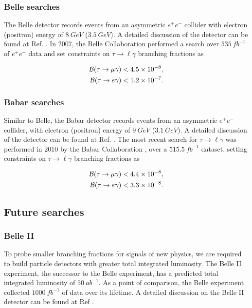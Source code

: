 \documentclass[12pt,a4paper]{article} %
\newcommand{\br}{\mathcal{B}}
\newcommand{\tmg}{\tau\to\mu\gamma}
\newcommand{\tlg}{\tau\to\ell\gamma}
\begin{document}
\subsubsection{Belle searches}


The Belle detector records events from an asymmetric $e^+ e^-$ collider with electron (positron) energy of $\SI{8}{GeV}$ ($\SI{3.5}{GeV}$). A detailed discussion of the detector can be found at Ref. \cite{Belle:2002}. In 2007, the Belle Collaboration performed a search over $\SI{535}{fb^{-1}}$ of $e^+ e^-$ data and set constraints \cite{Hayasaka:2007} on $\tlg$ branching fractions as

\begin{align}
\br(\tmg)&<\num{4.5d-8},\\
\br(\tau\to e \gamma)&<\num{1.2d-7}.
\end{align}


\subsubsection{Babar searches}

Similar to Belle, the Babar detector records events from an asymmetric $e^+e^-$ collider, with electron (positron) energy of $\SI{9}{GeV}$ ($\SI{3.1}{GeV}$). A detailed discussion of the detector can be found at Ref. \cite{Babar:2002}. The most recent search for $\tlg$ was performed in 2010 by the Babar Collaboration \cite{Babar:2010}, over a $\SI{515.5}{fb^{-1}}$ dataset, setting constraints on $\tlg$ branching fractions as

\begin{align}
\br(\tmg)&<\num{4.4d-8},\\
\br(\tau\to e \gamma)&<\num{3.3d-8}.
\end{align}



\subsection{Future searches}

\subsubsection{Belle II}

To probe smaller branching fractions for signals of new physics, we are required to build particle detectors with greater total integrated luminosity. The Belle II experiment, the successor to the Belle experiment, has a predicted total integrated luminosity of $\SI{50}{ab^{-1}}$. As a point of comparison, the Belle experiment collected $\SI{1000}{fb^{-1}}$ of data over its lifetime. A detailed discussion on the Belle II detector can be found at Ref \cite{Belle:2010}.
\end{document}
